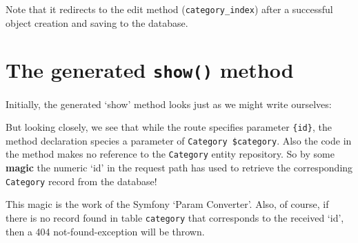 \documentclass[a4paperpaper,openright]{book}
\newenvironment{Shaded}{}{}
\newcommand{\AnnotationTok}[1]{\textcolor[rgb]{0.38,0.63,0.69}{\textbf{\textit{#1}}}}
\newcommand{\CommentTok}[1]{\textcolor[rgb]{0.38,0.63,0.69}{\textit{#1}}}
\newcommand{\KeywordTok}[1]{\textcolor[rgb]{0.00,0.44,0.13}{\textbf{#1}}}
\newcommand{\NormalTok}[1]{#1}
\newcommand{\OtherTok}[1]{\textcolor[rgb]{0.00,0.44,0.13}{#1}}
\newcommand{\StringTok}[1]{\textcolor[rgb]{0.25,0.44,0.63}{#1}}
\begin{document}
Note that it redirects to the edit method (\texttt{category\_index})
after a successful object creation and saving to the database.

\begin{Shaded}
\end{Shaded}

\hypertarget{the-generated-show-method}{%
\section{\texorpdfstring{The generated \texttt{show()}
method}{The generated show() method}}\label{the-generated-show-method}}

Initially, the generated `show' method looks just as we might write
ourselves:

\begin{Shaded}
\end{Shaded}

But looking closely, we see that while the route specifies parameter
\texttt{\{id\}}, the method declaration species a parameter of
\texttt{Category\ \$category}. Also the code in the method makes no
reference to the \texttt{Category} entity repository. So by some
\textbf{magic} the numeric `id' in the request path has used to retrieve
the corresponding \texttt{Category} record from the database!

This magic is the work of the Symfony `Param Converter'. Also, of
course, if there is no record found in table \texttt{category} that
corresponds to the received `id', then a 404 not-found-exception will be
thrown.
\end{document}
